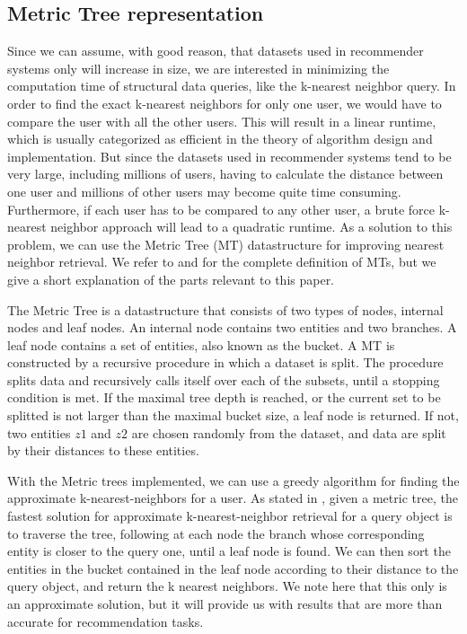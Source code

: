 \subsection{Metric Tree representation}
  Since we can assume, with good reason, that datasets used in recommender systems only will increase in size, we are interested in minimizing the computation time of structural data queries, like the k-nearest neighbor query.
  In order to find the exact k-nearest neighbors for only one user, we would have to compare the user with all the other users.
  This will result in a linear runtime, which is usually categorized as efficient in the theory of algorithm design and implementation. But since the datasets used in recommender systems tend to be very large, including millions of users, having to calculate the distance between one user and millions of other users may become quite time consuming.
  Furthermore, if each user has to be compared to any other user, a brute force k-nearest neighbor approach will lead to a quadratic runtime.
  As a solution to this problem, we can use the Metric Tree (MT) datastructure for improving nearest neighbor retrieval.
  We refer to \cite{jaeger2019counts} and \cite{uhlmann1991} for the complete definition of MTs, but we give a short explanation of the parts relevant to this paper.

  The Metric Tree is a datastructure that consists of two types of nodes, internal nodes and leaf nodes. An internal node contains two entities and two branches. A leaf node contains a set of entities, also known as the bucket.
  A MT is constructed by a recursive procedure in which a dataset is split. The procedure splits data and recursively calls itself over each of the subsets, until a stopping condition is met.
  If the maximal tree depth is reached, or the current set to be splitted is not larger than the maximal bucket size, a leaf node is returned.
  If not, two entities $z1$ and $z2$ are chosen randomly from the dataset, and data are split by their distances to these entities.

  With the Metric trees implemented, we can use a greedy algorithm for finding the approximate k-nearest-neighbors for a user.
  As stated in \cite{jaeger2019counts}, given a metric tree, the fastest solution for approximate k-nearest-neighbor retrieval for a query object is to traverse the tree, following at each node the branch whose corresponding entity is closer to the query one, until a leaf node is found.
  We can then sort the entities in the bucket contained in the leaf node according to their distance to the query object, and return the k nearest neighbors. We note here that this only is an approximate solution, but it will provide us with results that are more than accurate for recommendation tasks.
